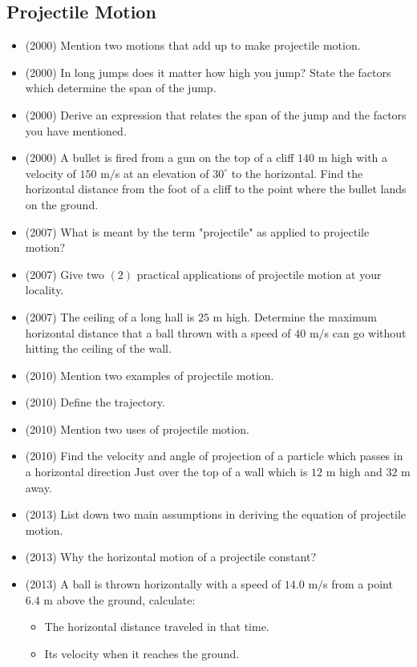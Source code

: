 \documentclass{article}
\begin{document}
\subsection{Projectile Motion}
\begin{itemize}
\item (2000)  Mention two motions that add up to make projectile motion.
\item (2000)  In long jumps does it matter how high you jump? State the factors which determine the span of the jump. 
\item (2000)  Derive an expression that relates the span of the jump and the factors you have mentioned.
\item (2000)  A bullet is fired from a gun on the top of a cliff $ 140$ m high with a velocity of $ 150$ m$/$s at an elevation of $ 30^{\circ}$ to the horizontal. Find the horizontal distance from the foot of a cliff to the point where the bullet lands on the ground.
\item (2007)  What is meant by the term "projectile" as applied to projectile motion?
\item (2007)  Give two $ (2)$ practical applications of projectile motion at your locality.
\item (2007)  The ceiling of a long hall is $ 25$ m high.  Determine the maximum horizontal distance that a ball thrown with a speed of $ 40$ m$/$s can go without hitting the ceiling of the wall.
\item (2010)  Mention two examples of projectile motion. 
\item (2010)  Define the trajectory. 
\item (2010)  Mention two uses of projectile motion.
\item (2010)  Find the velocity and angle of projection of a particle which passes in a horizontal direction Just over the top of a wall which is $ 12$ m high and $ 32$ m away. 
\item (2013)  List down two main assumptions in deriving the equation of projectile motion.
\item (2013)  Why the horizontal motion of a projectile constant? 
\item (2013)  A ball is thrown horizontally with a speed of $ 14.0$ m$/$s from a point $ 6.4$ m above the ground, calculate:
 \begin{itemize}
\item The horizontal distance traveled in that time.
\item Its velocity when it reaches the ground.
\end{itemize}

\end{itemize}
\end{document}
